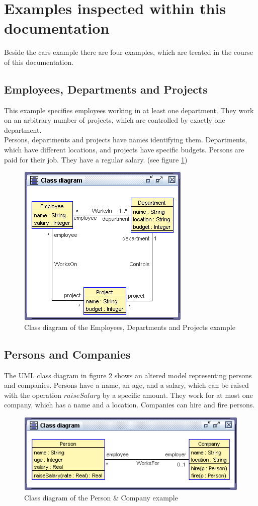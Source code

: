 \documentclass[a4paper,titlepage,oneside,final]{scrreprt} %
\begin{document}
\section{Examples inspected within this documentation}\label{examplesDocu}
Beside the cars example there are four examples, which are treated in
the course of this documentation.
\subsection{Employees, Departments and Projects}
This example specifies employees working in at least one department.
They work on an arbitrary number of projects, which are controlled by exactly one
department.\\
Persons, departments and projects have names identifying them. Departments, which have different locations,
and projects have specific budgets. Persons are paid for their job.
They have a regular salary. (see figure \ref{fig:exampleModel})
\begin{figure}[ht]
\centering
\includegraphics[scale=0.7]{Pictures/cls-EDP.png}
\caption{Class diagram of the Employees, Departments and Projects example}
\label{fig:exampleModel}
\end{figure}
\subsection{Persons and Companies}
The UML class diagram in figure \ref{fig:DiagramPersonCompany}
shows an altered model representing persons and companies.
Persons have a name, an age, and a salary, which can be raised
with the operation $\mathit{raiseSalary}$ by a specific amount.
They work for at most one company, which has a name and a location.
Companies can hire and fire persons.
\begin{figure}[ht]
\centering
\includegraphics[scale=0.7]{Pictures/cls-Employee.png}
\caption{Class diagram of the Person \& Company example}
\label{fig:DiagramPersonCompany}
\end{figure}
\end{document}
